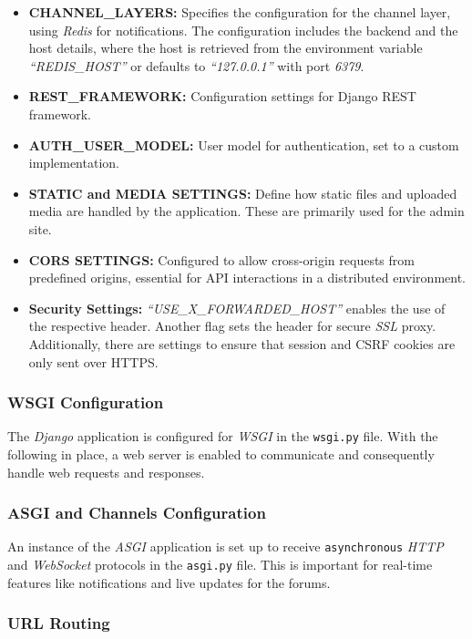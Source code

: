 \begin{itemize}
    \item \textbf{CHANNEL\_LAYERS:} Specifies the configuration for the channel layer, using \textit{Redis} for notifications. The configuration includes the backend and the host details, where the host is retrieved from the environment variable \textit{``REDIS\_HOST''} or defaults to \textit{``127.0.0.1''} with port \textit{6379}.
    \item \textbf{REST\_FRAMEWORK:} Configuration settings for Django REST framework.
    \item \textbf{AUTH\_USER\_MODEL:} User model for authentication, set to a custom implementation.
    \item \textbf{STATIC and MEDIA SETTINGS:} Define how static files and uploaded media are handled by the application. These are primarily used for the admin site. 
    \item \textbf{CORS SETTINGS:} Configured to allow cross-origin requests from predefined origins, essential for API interactions in a distributed environment.
    \item \textbf{Security Settings:} \textit{``USE\_X\_FORWARDED\_HOST''} enables the use of the respective header. Another flag sets the header for secure \textit{SSL} proxy. Additionally, there are settings to ensure that session and CSRF cookies are only sent over HTTPS.
\end{itemize}

\subsubsection{WSGI Configuration}

The \textit{Django} application is configured for \textit{WSGI} in the \texttt{wsgi.py} file. With the following in place, a web server is enabled to communicate and consequently handle web requests and responses.

\subsubsection{ASGI and Channels Configuration}

An instance of the \textit{ASGI} application is set up to receive \texttt{asynchronous} \textit{HTTP} and \textit{WebSocket} protocols in the \texttt{asgi.py} file. This is important for real-time features like notifications and live updates for the forums.

\subsubsection{URL Routing}

